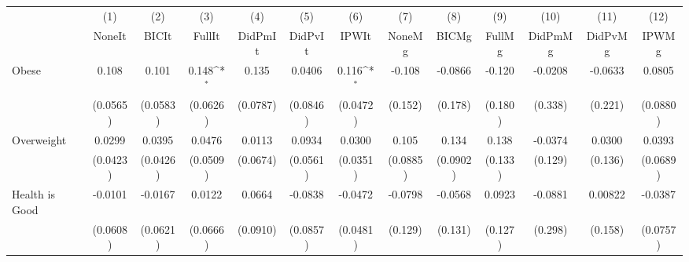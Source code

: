 {
\def\sym#1{\ifmmode^{#1}\else\(^{#1}\)\fi}
\begin{tabular}{l*{12}{c}}
\toprule
            &\multicolumn{1}{c}{(1)}&\multicolumn{1}{c}{(2)}&\multicolumn{1}{c}{(3)}&\multicolumn{1}{c}{(4)}&\multicolumn{1}{c}{(5)}&\multicolumn{1}{c}{(6)}&\multicolumn{1}{c}{(7)}&\multicolumn{1}{c}{(8)}&\multicolumn{1}{c}{(9)}&\multicolumn{1}{c}{(10)}&\multicolumn{1}{c}{(11)}&\multicolumn{1}{c}{(12)}\\
            &\multicolumn{1}{c}{NoneIt}&\multicolumn{1}{c}{BICIt}&\multicolumn{1}{c}{FullIt}&\multicolumn{1}{c}{DidPmIt}&\multicolumn{1}{c}{DidPvIt}&\multicolumn{1}{c}{IPWIt}&\multicolumn{1}{c}{NoneMg}&\multicolumn{1}{c}{BICMg}&\multicolumn{1}{c}{FullMg}&\multicolumn{1}{c}{DidPmMg}&\multicolumn{1}{c}{DidPvMg}&\multicolumn{1}{c}{IPWMg}\\
\midrule
Obese       &       0.108         &       0.101         &       0.148\sym{*}  &       0.135         &      0.0406         &       0.116\sym{*}  &      -0.108         &     -0.0866         &      -0.120         &     -0.0208         &     -0.0633         &      0.0805         \\
            &    (0.0565)         &    (0.0583)         &    (0.0626)         &    (0.0787)         &    (0.0846)         &    (0.0472)         &     (0.152)         &     (0.178)         &     (0.180)         &     (0.338)         &     (0.221)         &    (0.0880)         \\
\addlinespace
Overweight  &      0.0299         &      0.0395         &      0.0476         &      0.0113         &      0.0934         &      0.0300         &       0.105         &       0.134         &       0.138         &     -0.0374         &      0.0300         &      0.0393         \\
            &    (0.0423)         &    (0.0426)         &    (0.0509)         &    (0.0674)         &    (0.0561)         &    (0.0351)         &    (0.0885)         &    (0.0902)         &     (0.133)         &     (0.129)         &     (0.136)         &    (0.0689)         \\
\addlinespace
Health is Good&     -0.0101         &     -0.0167         &      0.0122         &      0.0664         &     -0.0838         &     -0.0472         &     -0.0798         &     -0.0568         &      0.0923         &     -0.0881         &     0.00822         &     -0.0387         \\
            &    (0.0608)         &    (0.0621)         &    (0.0666)         &    (0.0910)         &    (0.0857)         &    (0.0481)         &     (0.129)         &     (0.131)         &     (0.127)         &     (0.298)         &     (0.158)         &    (0.0757)         \\

\end{tabular}}
